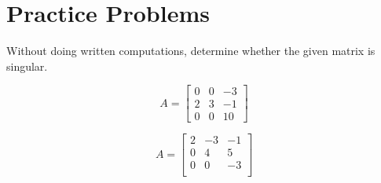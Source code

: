\documentclass{ximera}
\begin{document}
 
 
 
 
 
 
\section*{Practice Problems}
\begin{problem}
Without doing written computations, determine whether the given matrix is singular.
  \begin{problem}\label{prob:singmatrixdet1a}
  $$A=\begin{bmatrix}0&0&-3\\2&3&-1\\0&0&10\end{bmatrix}$$
  \begin{multipleChoice}
  \end{multipleChoice}
  \end{problem}
 
\begin{problem}\label{prob:singmatrixdet1b}
  $$A=\begin{bmatrix}2&-3&-1\\0&4&5\\0&0&-3\\\end{bmatrix}$$
  \begin{multipleChoice}
  \end{multipleChoice}
  \end{problem}
 
\end{problem}
\end{document}
